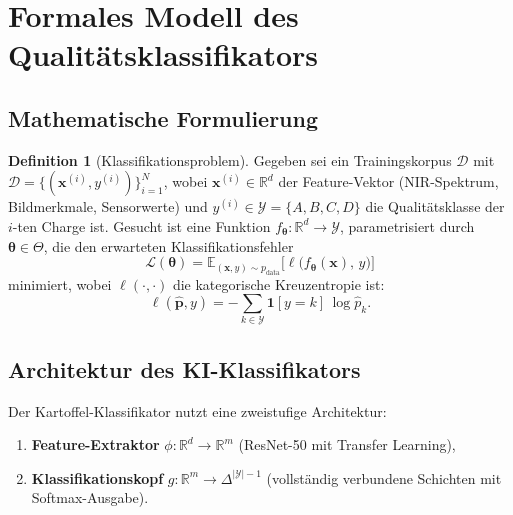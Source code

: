 ﻿\documentclass[12pt,a4paper]{article}
\theoremstyle{plain}
\theoremstyle{definition}
\newtheorem{definition}[theorem]{Definition}
\begin{document}
	\section{Formales Modell des Qualitätsklassifikators}
	
	\subsection{Mathematische Formulierung}
	
	\begin{definition}[Klassifikationsproblem]
		Gegeben sei ein Trainingskorpus
		$\mathcal{D}$ mit $\mathcal{D} = \{(\mathbf{x}^{(i)}, y^{(i)})\}_{i=1}^{N}$,
		wobei $\mathbf{x}^{(i)} \in \mathbb{R}^d$ der Feature-Vektor
		(NIR-Spektrum, Bildmerkmale, Sensorwerte) und
		$y^{(i)} \in \mathcal{Y} = \{A, B, C, D\}$ die Qualitätsklasse der
		$i$-ten Charge ist. Gesucht ist eine Funktion
		$f_{\boldsymbol{\theta}} : \mathbb{R}^d \to \mathcal{Y}$,
		parametrisiert durch $\boldsymbol{\theta} \in \Theta$, die den
		erwarteten Klassifikationsfehler
		\[
		\mathcal{L}(\boldsymbol{\theta}) =
		\mathbb{E}_{(\mathbf{x}, y) \sim p_{\mathrm{data}}}
		\bigl[\ell\bigl(f_{\boldsymbol{\theta}}(\mathbf{x}),\, y\bigr)\bigr]
		\]
		minimiert, wobei $\ell(\cdot,\cdot)$ die kategorische Kreuzentropie ist:
		\[
		\ell(\hat{\mathbf{p}}, y) = -\sum_{k \in \mathcal{Y}}
		\mathbf{1}[y=k]\,\log\hat{p}_k.
		\]
	\end{definition}
	
	\subsection{Architektur des KI-Klassifikators}
	
	Der Kartoffel-Klassifikator nutzt eine zweistufige Architektur:
	
	\begin{enumerate}
		\item \textbf{Feature-Extraktor} $\phi : \mathbb{R}^d \to \mathbb{R}^m$
		(ResNet-50 \cite{he2016} mit Transfer Learning),
		\item \textbf{Klassifikationskopf} $g : \mathbb{R}^m \to \Delta^{|\mathcal{Y}|-1}$
		(vollständig verbundene Schichten mit Softmax-Ausgabe).
	\end{enumerate}
	
\end{document}
